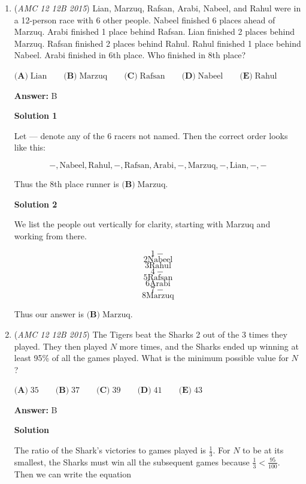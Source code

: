 \begin{enumerate}
 


	\item (\textit{AMC 12 12B 2015}) Lian, Marzuq, Rafsan, Arabi, Nabeel, and Rahul were in a 12-person race with 6 other people. Nabeel finished 6 places ahead of Marzuq. Arabi finished 1 place behind Rafsan. Lian finished 2 places behind Marzuq. Rafsan finished 2 places behind Rahul. Rahul finished 1 place behind Nabeel. Arabi finished in 6th place. Who finished in 8th place?


 $\textbf{(A)}\; \text{Lian} \qquad\textbf{(B)}\; \text{Marzuq} \qquad\textbf{(C)}\; \text{Rafsan} \qquad\textbf{(D)}\; \text{Nabeel} \qquad\textbf{(E)}\; \text{Rahul}$

 \textbf{Answer: }B



\textbf{Solution 1}

Let --- denote any of the 6 racers not named. Then the correct order looks like this:

 
 \[-, \text{Nabeel}, \text{Rahul}, -, \text{Rafsan}, \text{Arabi}, -, \text{Marzuq}, -, \text{Lian}, -, -\]

 Thus the 8th place runner is $\boxed{\textbf{(B)}\; \text{Marzuq}}$.

 



\textbf{Solution 2}

We list the people out vertically for clarity, starting with Marzuq and working from there.

 

 \[1 -\]
 \[2 \text{Nabeel}\]
 \[3 \text{Rahul}\]
 \[4 -\]
 \[5 \text{Rafsan}\]
 \[6 \text{Arabi}\]
 \[7 -\]
 \[8 \text{Marzuq}\]

 Thus our answer is $\boxed{\textbf{(B)}\; \text{Marzuq}}$.

 


	\item (\textit{AMC 12 12B 2015}) The Tigers beat the Sharks 2 out of the 3 times they played. They then played $N$ more times, and the Sharks ended up winning at least 95\% of all the games played. What is the minimum possible value for $N$?


 $\textbf{(A)}\; 35 \qquad  \textbf{(B)}\; 37 \qquad \textbf{(C)}\; 39 \qquad \textbf{(D)}\; 41 \qquad \textbf{(E)}\; 43$

 \textbf{Answer: }B



\textbf{Solution}

The ratio of the Shark's victories to games played is $\frac{1}{3}$. For $N$ to be at its smallest, the Sharks must win all the subsequent games because $\frac{1}{3} < \frac{95}{100}$. Then we can write the equation


\end{enumerate}
